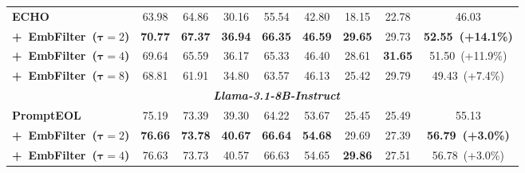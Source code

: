 \documentclass[sigconf]{acmart}
\begin{document}
\begin{table}[t]
{\begin{tabular}{lcccccccc}
            \cmidrule(l{4pt}r{4pt}){1-9}
            \textbf{\textrm{ECHO}} & 63.98 & 64.86 & 30.16 & 55.54 & 42.80 & 18.15 & 22.78 & 46.03 \\
            \cmidrule(l{1pt}r{1pt}){1-9}
            \quad \textbf{\textrm{+~EmbFilter~(\(\mathbf{\tau}=2\))}} & \cellcolor{MediumPurple!15} \textbf{70.77} & \cellcolor{MediumPurple!15} \textbf{67.37} & \cellcolor{MediumPurple!15} \textbf{36.94} & \cellcolor{MediumPurple!15} \textbf{66.35} & \cellcolor{MediumPurple!15} \textbf{46.59} & \cellcolor{MediumPurple!15} \textbf{29.65} & \cellcolor{MediumPurple!15} 29.73 & \cellcolor{MediumPurple!15} \textbf{52.55~(+14.1\%)} \\
            \quad \textbf{\textrm{+~EmbFilter~(\(\mathbf{\tau}=4\))}} & \cellcolor{MediumPurple!15} 69.64 & \cellcolor{MediumPurple!15} 65.59 & \cellcolor{MediumPurple!15} 36.17 & \cellcolor{MediumPurple!15} 65.33 & \cellcolor{MediumPurple!15} 46.40 & \cellcolor{MediumPurple!15} 28.61 & \cellcolor{MediumPurple!15} \textbf{31.65} & \cellcolor{MediumPurple!15} 51.50~(+11.9\%) \\
            \quad \textbf{\textrm{+~EmbFilter~(\(\mathbf{\tau}=8\))}} & \cellcolor{MediumPurple!15} 68.81 & 61.91 & \cellcolor{MediumPurple!15} 34.80 & \cellcolor{MediumPurple!15} 63.57 & \cellcolor{MediumPurple!15} 46.13 & \cellcolor{MediumPurple!15} 25.42 & \cellcolor{MediumPurple!15} 29.79 & \cellcolor{MediumPurple!15} 49.43~(+7.4\%) \\
            \midrule
            \multicolumn{1}{c}{} & \multicolumn{7}{c}{\textbf{\textit{\textrm{Llama-3.1-8B-Instruct}}}} \\
            \midrule
            \textbf{\textrm{PromptEOL}} & 75.19 & 73.39 & 39.30 & 64.22 & 53.67 & 25.45 & 25.49 & 55.13   \\
            \cmidrule(l{1pt}r{1pt}){1-9}
            \quad \textbf{\textrm{+~EmbFilter~(\(\mathbf{\tau}=2\))}} & \cellcolor{MediumTurquoise!15} \textbf{76.66} & \cellcolor{MediumTurquoise!15} \textbf{73.78} & \cellcolor{MediumTurquoise!15} \textbf{40.67} & \cellcolor{MediumTurquoise!15} \textbf{66.64} & \cellcolor{MediumTurquoise!15} \textbf{54.68} & \cellcolor{MediumTurquoise!15} 29.69 & \cellcolor{MediumTurquoise!15} 27.39 & \cellcolor{MediumTurquoise!15} \textbf{56.79~(+3.0\%) }\\
            \quad \textbf{\textrm{+~EmbFilter~(\(\mathbf{\tau}=4\))}} & \cellcolor{MediumTurquoise!15} 76.63 & \cellcolor{MediumTurquoise!15} 73.73 & \cellcolor{MediumTurquoise!15} 40.57 & \cellcolor{MediumTurquoise!15} 66.63 & \cellcolor{MediumTurquoise!15} 54.65 & \cellcolor{MediumTurquoise!15} \textbf{29.86} & \cellcolor{MediumTurquoise!15} 27.51 & \cellcolor{MediumTurquoise!15} 56.78~(+3.0\%) \\

\end{tabular}}
\end{table}
\end{document}

